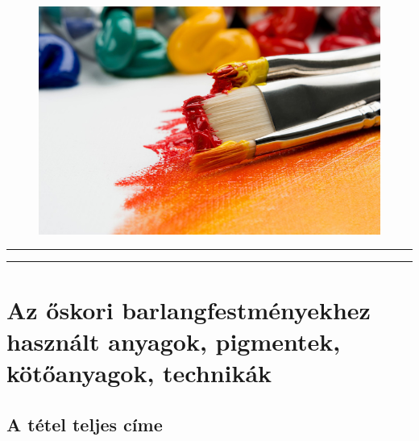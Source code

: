 \begin{titlepage}
	\begin{figure}[h!]
		\centering
		\includegraphics[width=0.9\linewidth]{cover}
	\end{figure}
	
	
	
	
	
	\rule{\textwidth}{0.4pt} %
	
	\vspace{2pt}\vspace{-\baselineskip} %
	
	\rule{\textwidth}{1pt} %
	
\end{titlepage}


\section{Az őskori barlangfestményekhez használt  anyagok, pigmentek, kötőanyagok, technikák}

	\subsection{A tétel teljes címe}
	
